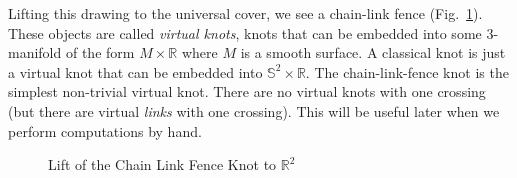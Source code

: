 \documentclass{article}
\theoremstyle{plain}
\begin{document}
        Lifting this drawing to the universal cover, we see a chain-link fence
        (Fig.~\ref{fig:chain_link_fence_knot_on_flat_torus_universal_cover}).
        These objects are called \textit{virtual knots}, knots that can be
        embedded into some 3-manifold of the form $M\times\mathbb{R}$ where
        $M$ is a smooth surface. A classical knot is just a virtual knot
        that can be embedded into $\mathbb{S}^{2}\times\mathbb{R}$. The
        chain-link-fence knot is the simplest non-trivial virtual knot.
        There are no virtual knots with one crossing
        (but there are virtual \textit{links} with one crossing). This will be
        useful later when we perform computations by hand.
        \begin{figure}
            \centering
            \caption{Lift of the Chain Link Fence Knot to $\mathbb{R}^{2}$}
            \label{fig:chain_link_fence_knot_on_flat_torus_universal_cover}
        \end{figure}
\end{document}
